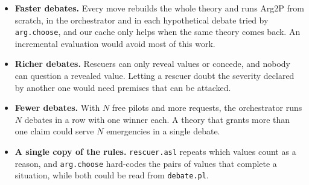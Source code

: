 \begin{itemize}
    \item \textbf{Faster debates.} Every move rebuilds the whole theory and runs Arg2P from scratch, in the orchestrator and in each hypothetical debate tried by \texttt{arg.choose}, and our cache only helps when the same theory comes back. An incremental evaluation would avoid most of this work.
    \item \textbf{Richer debates.} Rescuers can only reveal values or concede, and nobody can question a revealed value. Letting a rescuer doubt the severity declared by another one would need premises that can be attacked.
    \item \textbf{Fewer debates.} With $N$ free pilots and more requests, the orchestrator runs $N$ debates in a row with one winner each. A theory that grants more than one claim could serve $N$ emergencies in a single debate.
    \item \textbf{A single copy of the rules.} \texttt{rescuer.asl} repeats which values count as a reason, and \texttt{arg.choose} hard-codes the pairs of values that complete a situation, while both could be read from \texttt{debate.pl}.
\end{itemize}
